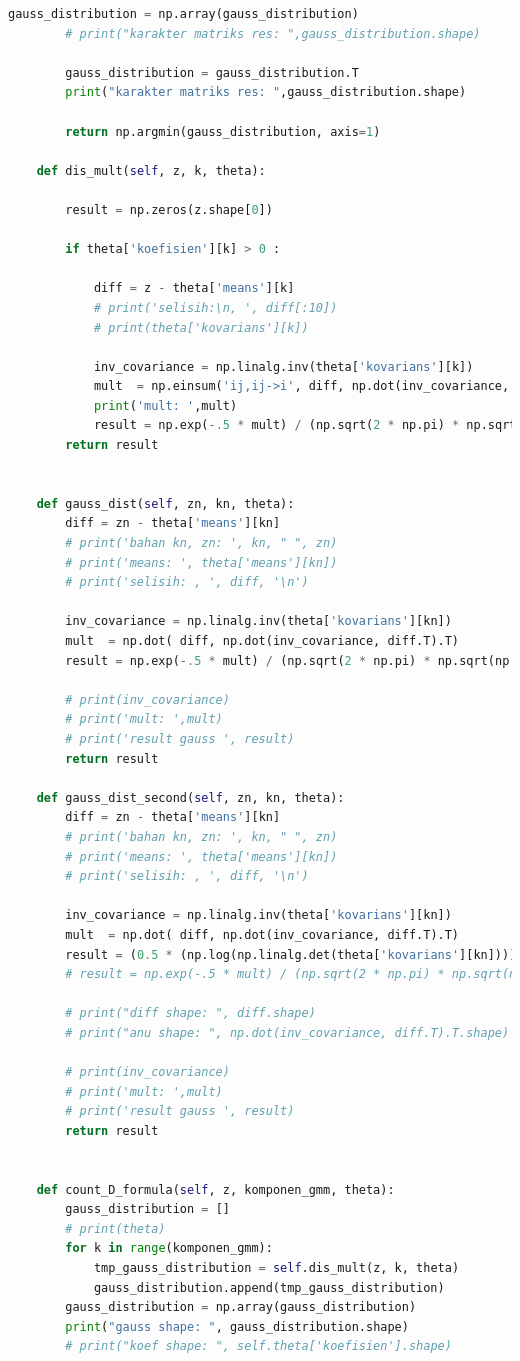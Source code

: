 \begin{lstlisting}[language=Python, basicstyle=\tiny]
		gauss_distribution = np.array(gauss_distribution)
		# print("karakter matriks res: ",gauss_distribution.shape)

		gauss_distribution = gauss_distribution.T
		print("karakter matriks res: ",gauss_distribution.shape)

		return np.argmin(gauss_distribution, axis=1)

	def dis_mult(self, z, k, theta):

		result = np.zeros(z.shape[0])

		if theta['koefisien'][k] > 0 :

			diff = z - theta['means'][k]
			# print('selisih:\n, ', diff[:10])
			# print(theta['kovarians'][k])

			inv_covariance = np.linalg.inv(theta['kovarians'][k])
			mult  = np.einsum('ij,ij->i', diff, np.dot(inv_covariance, diff.T).T)
			print('mult: ',mult)
			result = np.exp(-.5 * mult) / (np.sqrt(2 * np.pi) * np.sqrt(np.linalg.det(theta['kovarians'][k])))
		return result


	def gauss_dist(self, zn, kn, theta):
		diff = zn - theta['means'][kn]
		# print('bahan kn, zn: ', kn, " ", zn)
		# print('means: ', theta['means'][kn])
		# print('selisih: , ', diff, '\n')

		inv_covariance = np.linalg.inv(theta['kovarians'][kn])
		mult  = np.dot( diff, np.dot(inv_covariance, diff.T).T)
		result = np.exp(-.5 * mult) / (np.sqrt(2 * np.pi) * np.sqrt(np.linalg.det(theta['kovarians'][kn])))

		# print(inv_covariance)
		# print('mult: ',mult)
		# print('result gauss ', result)
		return result

	def gauss_dist_second(self, zn, kn, theta):
		diff = zn - theta['means'][kn]
		# print('bahan kn, zn: ', kn, " ", zn)
		# print('means: ', theta['means'][kn])
		# print('selisih: , ', diff, '\n')

		inv_covariance = np.linalg.inv(theta['kovarians'][kn])
		mult  = np.dot( diff, np.dot(inv_covariance, diff.T).T)
		result = (0.5 * (np.log(np.linalg.det(theta['kovarians'][kn])))) + (0.5 * mult)
		# result = np.exp(-.5 * mult) / (np.sqrt(2 * np.pi) * np.sqrt(np.linalg.det(theta['kovarians'][kn])))
		
		# print("diff shape: ", diff.shape)
		# print("anu shape: ", np.dot(inv_covariance, diff.T).T.shape)

		# print(inv_covariance)
		# print('mult: ',mult)
		# print('result gauss ', result)
		return result


	def count_D_formula(self, z, komponen_gmm, theta):
		gauss_distribution = []
		# print(theta)
		for k in range(komponen_gmm):
			tmp_gauss_distribution = self.dis_mult(z, k, theta)
			gauss_distribution.append(tmp_gauss_distribution)
		gauss_distribution = np.array(gauss_distribution)
		print("gauss shape: ", gauss_distribution.shape)
		# print("koef shape: ", self.theta['koefisien'].shape)


\end{lstlisting}
